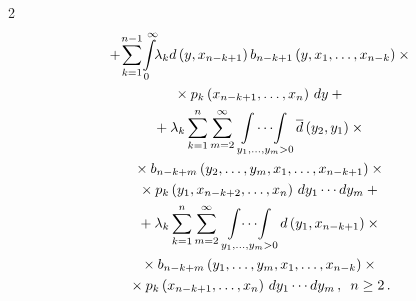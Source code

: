 \begin{multicols}{2}
\begin{multline}
{}+\!


\sum\limits_{k=1}^{n-1}\! \int\limits_0^\infty\!\! \lambda_k 


d\left(y,x_{n-k+1}\right)


b_{n-k+1}\left(y,x_1,\ld,x_{n-k}\right)\times{}\\


{}\times


p_k\left(x_{n-k+1},\ld,x_{n}\right)\, dy


+{}


\\


{}+


\lambda_k \sum\limits_{k=1}^{n}


\sum\limits_{m=2}^{\infty}


\mathop{\!\int\cdots\!\int}\limits_{y_1,\ld,y_{m}>0}


\d\left(y_2,y_{1}\right)\times{}\\


{}\times


b_{n-k+m}\left(y_2,\ld,y_m,x_1,\ld,x_{n-k+1}\right)\times{}\\


{}\times


p_k\left(y_1,x_{n-k+2},\ld,x_{n}\right)\, dy_1\cdots dy_m


+{}


\\


{}+


\lambda_k \sum\limits_{k=1}^{n}


\sum\limits_{m=2}^{\infty}


\mathop{\int\!\cdots\!\int}\limits_{y_1,\ld,y_{m}>0}


d\left(y_1,x_{n-k+1}\right)\times{}\\


{}\times


b_{n-k+m}\left(y_1,\ld,y_m,x_1,\ld,x_{n-k}\right)\times{}\\


{}\times


p_k\left(x_{n-k+1},\ld,x_{n}\right)\, dy_1\cdots dy_m\,,


\enskip


n\ge2\,.


\label{e2}


\end{multline}












\end{multicols}
